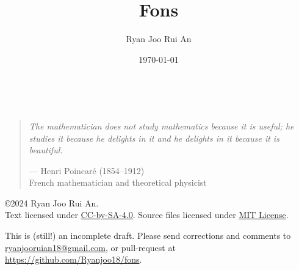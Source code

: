 \documentclass[12pt,a4 paper]{extreport}
\begin{document}
%

\begin{titlepage}
\title{\sffamily\bfseries Fons}
\author{Ryan Joo Rui An}
\date{\today}

\vfill
{}
\vfill
\vfill
\end{titlepage}

\maketitle
\pagebreak

\

\vfill

\begin{quote}
\textit{The mathematician does not study mathematics because it is useful; he studies it because he delights in it and he delights in it because it is beautiful.}

\begin{flushright}--- Henri Poincar\'{e} (1854--1912)\\
French mathematician and theoretical physicist\end{flushright}
\end{quote}

\vfill

\copyright 2024 Ryan Joo Rui An.\\
Text licensed under \href{https://creativecommons.org/licenses/by-sa/4.0/}{CC-by-SA-4.0}. Source files licensed under \href{https://www.mit.edu/~amini/LICENSE.md}{MIT License}.

This is (still!) an incomplete draft. Please send corrections and comments to \url{ryanjooruian18@gmail.com}, or pull-request at \url{https://github.com/Ryanjoo18/fons}.
\end{document}

